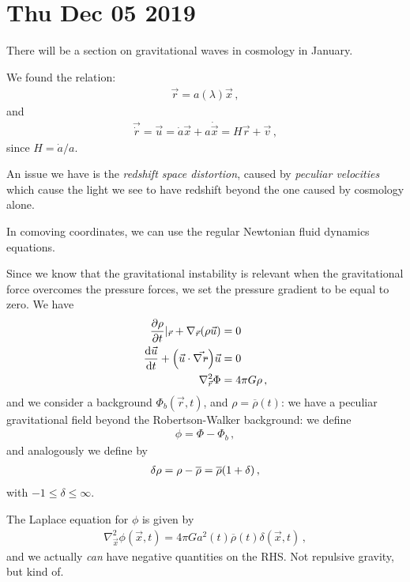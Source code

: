 \documentclass[main.tex]{subfiles}
\begin{document}
\section*{Thu Dec 05 2019}

There will be a section on gravitational waves in cosmology in January. 

We found the relation: 
%
\begin{align}
  \vec{r}  = a(\lambda ) \vec{x}
\,,
\end{align}
%
and 
%
\begin{align}
  \vec{\dot{r}} = \vec{u} = \dot{a} \vec{x} + a \dot{\vec{x}} = H \vec{r} + \vec{v}
\,,
\end{align}
%
since \(H = \dot{a} / a\). 

An issue we have is the \emph{redshift space distortion}, caused by \emph{peculiar velocities} which cause the light we see to have redshift beyond the one caused by cosmology alone. 

In comoving coordinates, we can use the regular Newtonian fluid dynamics equations. 

Since we know that the gravitational instability is relevant when the gravitational force overcomes the pressure forces, we set the pressure gradient to be equal to zero. We have 
%
\begin{align}
  \pdv{\rho }{t} |_{\vec{r}} + \nabla_{\vec{r}} \qty(\rho \vec{u}) &= 0  \\
  \dv{\vec{u}}{t} + \qty(\vec{u} \cdot \vec{\nabla_{\vec{r}}}) \vec{u} &=0  \\
  \nabla_{\vec{r}}^2 \Phi &= 4 \pi G \rho 
\,,
\end{align}
%
and we consider a background \(\Phi_b (\vec{r}, t)\), and \(\rho = \overline{\rho}(t)\): we have a peculiar gravitational field beyond the Robertson-Walker background: we define 
%
\begin{align}
  \phi  = \Phi - \Phi_b
\,,
\end{align}
%
and analogously we define by 
%
\begin{align}
  \delta \rho = \rho - \overline{\rho} = \overline{\rho} \qty(1 + \delta )
\,,
\end{align}
%
with \(-1 \leq \delta \leq \infty\). 

The Laplace equation for \(\phi \) is given by 
%
\begin{align}
  \nabla^2_{\vec{x}} \phi (\vec{x}, t) = 4 \pi G a^2(t) \overline{\rho} (t) \delta (\vec{x}, t)
\,,
\end{align}
%
and we actually \emph{can} have negative quantities on the RHS. Not repulsive gravity, but kind of. 
\end{document}
